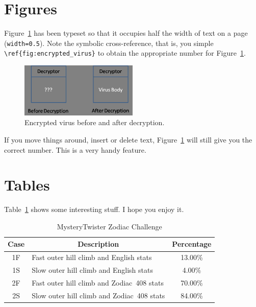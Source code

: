 \section{Figures}

Figure~\ref{fig:encrypted_virus} has been typeset so that it
occupies half the width of text on a page ({\tt width=0.5}). Note the 
symbolic cross-reference, that is, you simple \verb+\ref{fig:encrypted_virus}+
to obtain the appropriate number for Figure~\ref{fig:encrypted_virus}.

\begin{figure}[htb]
\centering
\includegraphics[width=0.5\textwidth]{images/encrypted_virus.jpg}
\caption{Encrypted virus before and after decryption.} 
\label{fig:encrypted_virus}
\end{figure}

If you move things around, insert or delete text, Figure~\ref{fig:encrypted_virus}
will still give you the correct number. This is a very handy feature.


\section{Tables}

Table~\ref{tab:19} 
shows some interesting stuff. I hope you enjoy it.

\begin{table}[htb]
\caption{MysteryTwister Zodiac Challenge\label{tab:19}}
\begin{center}
\begin{tabular}{c|lc}\hline\hline
Case & \multicolumn{1}{c}{Description} & Percentage\\ \hline
1F & Fast outer hill climb and English stats & 13.00\% \\
1S & Slow outer hill climb and English stats & \phantom{0}4.00\% \\
2F & Fast outer hill climb and Zodiac~408 stats & 70.00\% \\
2S & Slow outer hill climb and Zodiac~408 stats & 84.00\% \\ \hline\hline
\end{tabular}
\end{center}
\end{table}


